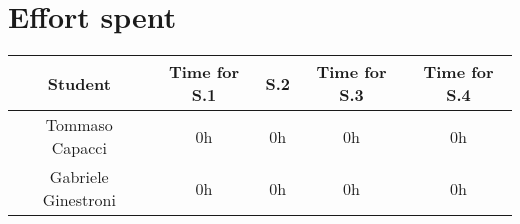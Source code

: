 \section{Effort spent}
\begin{tabular}{ | c || c | c | c | c|}
    \hline
    Student        & Time for S.1 & S.2 & Time for S.3 & Time for S.4 \\ \hline
    Tommaso Capacci & 0h           & 0h  & 0h          & 0h           \\ \hline
    Gabriele Ginestroni  & 0h           & 0h  & 0h          & 0h           \\ \hline
    \hline
\end{tabular}